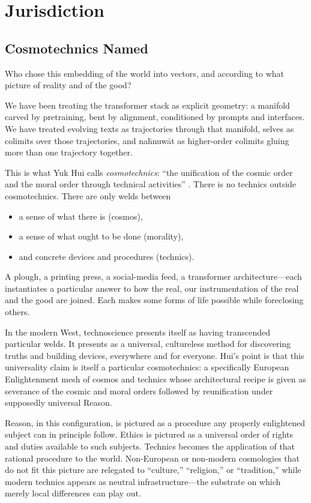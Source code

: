 \chapter{Jurisdiction}

\section{Cosmotechnics Named}

Who chose this embedding of the world into vectors, and according to what picture of reality and of the good?

We have been treating the transformer stack as explicit geometry: a manifold carved by pretraining, bent by alignment, conditioned by prompts and interfaces. We have treated evolving texts as trajectories through that manifold, selves as colimits over those trajectories, and na\={h}nuw\={a}t as higher-order colimits gluing more than one trajectory together. 

This is what Yuk Hui calls \emph{cosmotechnics}: ``the unification of the cosmic order and the moral order through technical activities'' \cite{Hui2016}. There is no technics outside cosmotechnics. There are only welds between

\begin{itemize}
  \item a sense of what there is (cosmos),
  \item a sense of what ought to be done (morality),
  \item and concrete devices and procedures (technics).
\end{itemize}

A plough, a printing press, a social-media feed, a transformer architecture---each instantiates a particular answer to how the real, our instrumentation of the real and the good are joined. Each makes some forms of life possible while foreclosing others.

In the modern West, technoscience presents itself as having transcended particular welds. It presents as a universal, cultureless method for discovering truths and building devices, everywhere and for everyone. Hui's point is that this universality claim is itself a particular cosmotechnics: a specifically European Enlightenment mesh of cosmos and technics whose architectural recipe is given  as severance of the cosmic and moral orders followed by reunification under supposedly universal Reason.

Reason, in this configuration, is pictured as a procedure any properly enlightened subject can in principle follow. Ethics is pictured as a universal order of rights and duties available to such subjects. Technics becomes the application of that rational procedure to the world. Non-European or non-modern cosmologies that do not fit this picture are relegated to ``culture,'' ``religion,'' or ``tradition,'' while modern technics appears as neutral infrastructure---the substrate on which merely local differences can play out.

